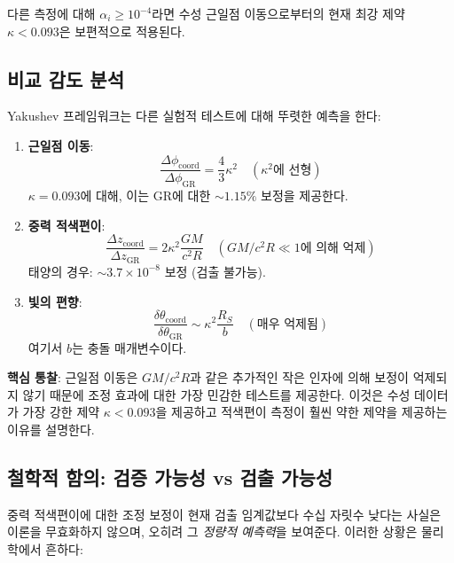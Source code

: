 \documentclass[11pt,a4paper]{article}
\begin{document}
다른 측정에 대해 $\alpha_i \geq 10^{-4}$라면 수성 근일점 이동으로부터의 현재 최강 제약 $\kappa < 0.093$은 보편적으로 적용된다.

\subsection{비교 감도 분석}
\label{subsec:comparative-sensitivity}

Yakushev 프레임워크는 다른 실험적 테스트에 대해 뚜렷한 예측을 한다:

\begin{enumerate}
\item \textbf{근일점 이동}: 
\[
\frac{\Delta\phi_{\text{coord}}}{\Delta\phi_{\text{GR}}} = \frac{4}{3}\kappa^2 \quad (\text{$\kappa^2$에 선형})
\]
$\kappa = 0.093$에 대해, 이는 GR에 대한 $\sim 1.15\%$ 보정을 제공한다.

\item \textbf{중력 적색편이}:
\[
\frac{\Delta z_{\text{coord}}}{\Delta z_{\text{GR}}} = 2\kappa^2 \frac{GM}{c^2R} \quad (\text{$GM/c^2R \ll 1$에 의해 억제})
\]
태양의 경우: $\sim 3.7\times10^{-8}$ 보정 (검출 불가능).

\item \textbf{빛의 편향}:
\[
\frac{\delta\theta_{\text{coord}}}{\delta\theta_{\text{GR}}} \sim \kappa^2 \frac{R_S}{b} \quad (\text{매우 억제됨})
\]
여기서 $b$는 충돌 매개변수이다.
\end{enumerate}

\textbf{핵심 통찰}: 근일점 이동은 $GM/c^2R$과 같은 추가적인 작은 인자에 의해 보정이 억제되지 않기 때문에 조정 효과에 대한 가장 민감한 테스트를 제공한다. 이것은 수성 데이터가 가장 강한 제약 $\kappa < 0.093$을 제공하고 적색편이 측정이 훨씬 약한 제약을 제공하는 이유를 설명한다.

\subsection{철학적 함의: 검증 가능성 vs 검출 가능성}
\label{subsec:philosophy-testability}

중력 적색편이에 대한 조정 보정이 현재 검출 임계값보다 수십 자릿수 낮다는 사실은 이론을 무효화하지 않으며, 오히려 그 \emph{정량적 예측력}을 보여준다. 이러한 상황은 물리학에서 흔하다:
\end{document}
